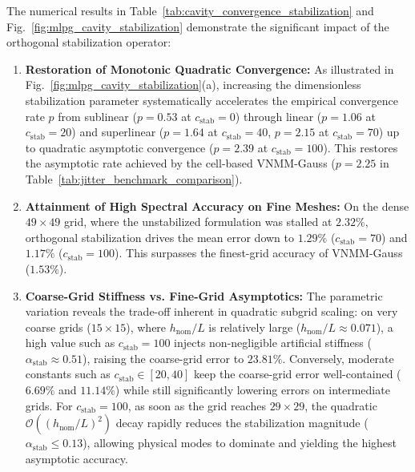 \documentclass[VANCOUVER,Times1COL]{WileyNJD-v5}
\begin{document}
The numerical results in Table~\ref{tab:cavity_convergence_stabilization} and Fig.~\ref{fig:mlpg_cavity_stabilization} demonstrate the significant impact of the orthogonal stabilization operator:
\begin{enumerate}
    \item \textbf{Restoration of Monotonic Quadratic Convergence:} As illustrated in Fig.~\ref{fig:mlpg_cavity_stabilization}(a), increasing the dimensionless stabilization parameter systematically accelerates the empirical convergence rate $p$ from sublinear ($p = 0.53$ at $c_{\mathrm{stab}} = 0$) through linear ($p = 1.06$ at $c_{\mathrm{stab}} = 20$) and superlinear ($p = 1.64$ at $c_{\mathrm{stab}} = 40$, $p = 2.15$ at $c_{\mathrm{stab}} = 70$) up to quadratic asymptotic convergence ($p = 2.39$ at $c_{\mathrm{stab}} = 100$). This restores the asymptotic rate achieved by the cell-based VNMM-Gauss ($p = 2.25$ in Table~\ref{tab:jitter_benchmark_comparison}).
    \item \textbf{Attainment of High Spectral Accuracy on Fine Meshes:} On the dense $49 \times 49$ grid, where the unstabilized formulation was stalled at $2.32\%$, orthogonal stabilization drives the mean error down to $1.29\%$ ($c_{\mathrm{stab}} = 70$) and $\mathbf{1.17\%}$ ($c_{\mathrm{stab}} = 100$). This surpasses the finest-grid accuracy of VNMM-Gauss ($1.53\%$).
    \item \textbf{Coarse-Grid Stiffness vs. Fine-Grid Asymptotics:} The parametric variation reveals the trade-off inherent in quadratic subgrid scaling: on very coarse grids ($15 \times 15$), where $h_{\mathrm{nom}}/L$ is relatively large ($h_{\mathrm{nom}}/L \approx 0.071$), a high value such as $c_{\mathrm{stab}} = 100$ injects non-negligible artificial stiffness ($\alpha_{\mathrm{stab}} \approx 0.51$), raising the coarse-grid error to $23.81\%$. Conversely, moderate constants such as $c_{\mathrm{stab}} \in [20, 40]$ keep the coarse-grid error well-contained ($6.69\%$ and $11.14\%$) while still significantly lowering errors on intermediate grids. For $c_{\mathrm{stab}} = 100$, as soon as the grid reaches $29 \times 29$, the quadratic $\mathcal{O}((h_{\mathrm{nom}}/L)^2)$ decay rapidly reduces the stabilization magnitude ($\alpha_{\mathrm{stab}} \le 0.13$), allowing physical modes to dominate and yielding the highest asymptotic accuracy.

\end{enumerate}
\end{document}

